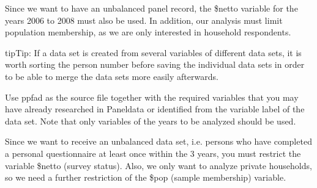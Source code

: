 \documentclass[letterpaper,10pt,openany,onesideH,english]{sphinxmanual}
\begin{document}
Since we want to have an unbalanced panel record, the \$netto variable for the years 2006 to 2008 must also be used. In addition, our analysis must limit population membership, as we are only interested in household respondents.

\begin{sphinxadmonition}{tip}{Tip:}
If a data set is created from several variables of different data sets, it is worth sorting the person number before saving the individual data sets in order to be able to merge the data sets more easily afterwards.
\end{sphinxadmonition}


Use ppfad as the source file together with the required variables that you may have already researched in Paneldata or identified from the variable label of the data set. Note that only variables of the years to be analyzed should be used.

%
\begin{sphinxVerbatim}[commandchars=\\\{\},numbers=left,firstnumber=1,stepnumber=1]

                

\end{sphinxVerbatim}

Since we want to receive an unbalanced data set, i.e. persons who have completed a personal questionnaire at least once within the 3 years, you must restrict the variable \$netto (survey status). Also, we only want to analyze private households, so we need a further restriction of the \$pop (sample membership) variable.
\end{document}
